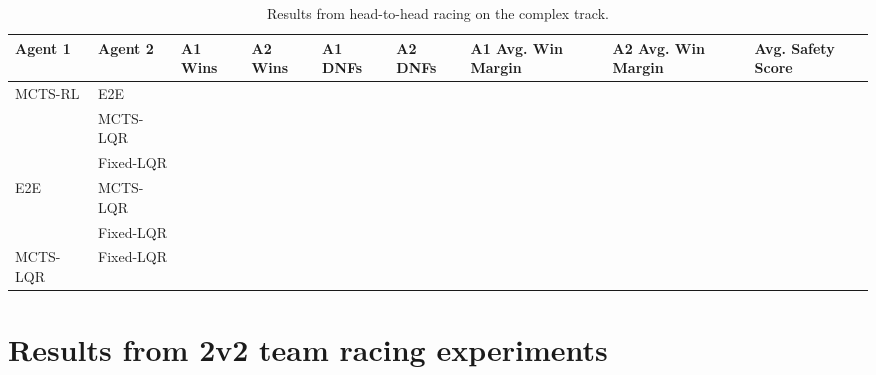 \begin{table} [H]
\centering
\begin{tabular}{@{}lllllllll@{}} 
\toprule
Agent 1  & Agent 2  & A1 Wins & A2 Wins & A1 DNFs & A2 DNFs & A1 Avg. Win Margin & A2 Avg. Win Margin & Avg. Safety Score \\ \midrule
MCTS-RL  & E2E       &         &         &         &         &                  &   &               \\
         & MCTS-LQR  &         &         &         &         &                  &   &               \\
         & Fixed-LQR &         &         &         &         &                  &   &               \\
E2E      & MCTS-LQR  &         &         &         &         &                  &    &              \\
         & Fixed-LQR &         &         &         &         &                  &    &              \\
MCTS-LQR & Fixed-LQR &         &         &         &         &                  &   &               \\ \bottomrule

\end{tabular}
\vspace{1 mm}
\caption{Results from head-to-head racing on the complex track.}
 \label{tab:results_complex}
\end{table}

\section{Results from 2v2 team racing experiments} \label{app:team_results}